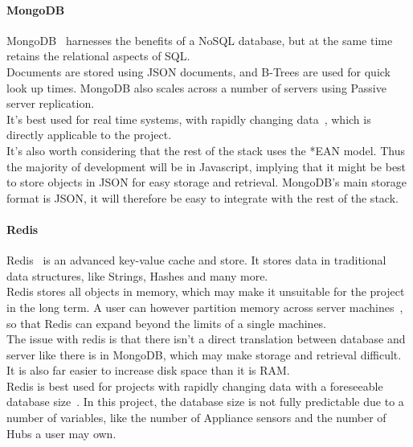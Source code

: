 \documentclass[preprint,12pt,3p]{elsarticle}
\begin{document}
\paragraph{MongoDB}
MongoDB~\cite{mongodb} harnesses the benefits of a NoSQL database, but at the same time retains the relational aspects of SQL.\\
Documents are stored using JSON documents, and B-Trees are used for quick look up times. MongoDB also scales across a number of servers using Passive server replication.\\
It's best used for real time systems, with rapidly changing data~\cite{databasecomparison}, which is directly applicable to the project.\\
It's also worth considering that the rest of the stack uses the *EAN model. Thus the majority of development will be in Javascript, implying that it might be best to store objects in JSON for easy storage and retrieval. MongoDB's main storage format is JSON, it will therefore be easy to integrate with the rest of the stack. 

\paragraph{Redis}
Redis~\cite{redis} is an advanced key-value cache and store. It stores data in traditional data structures, like Strings, Hashes and many more.\\
Redis stores all objects in memory, which may make it unsuitable for the project in the long term. A user can however partition memory across server machines~\cite{redisfaq}, so that Redis can expand beyond the limits of a single machines.\\
The issue with redis is that there isn't a direct translation between database and server like there is in MongoDB, which may make storage and retrieval difficult. It is also far easier to increase disk space than it is RAM.\\
Redis is best used for projects with rapidly changing data with a foreseeable database size~\cite{databasecomparison}. In this project, the database size is not fully predictable due to a number of variables, like the number of Appliance sensors and the number of Hubs a user may own.
\end{document}
